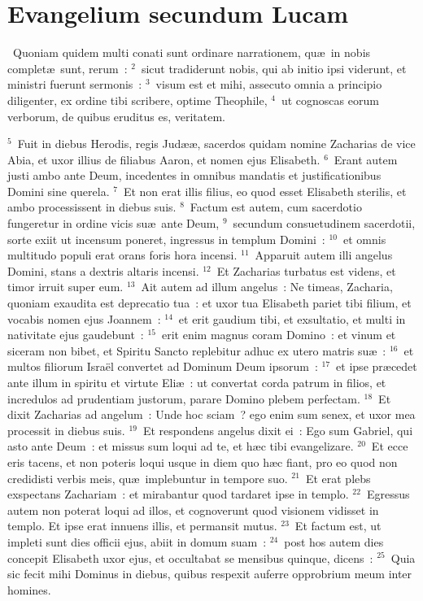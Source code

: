 \clearpage
{\centering \section*{Evangelium secundum Lucam}}\thispagestyle{empty}

~Quoniam quidem multi conati sunt ordinare narrationem, qu\ae\ in nobis complet\ae\ sunt, rerum~:
${}^{2}$~sicut tradiderunt nobis, qui ab initio ipsi viderunt, et ministri fuerunt sermonis~:
${}^{3}$~visum est et mihi, assecuto omnia a principio diligenter, ex ordine tibi scribere, optime Theophile,
${}^{4}$~ut cognoscas eorum verborum, de quibus eruditus es, veritatem.


${}^{5}$~Fuit in diebus Herodis, regis Jud\ae \ae , sacerdos quidam nomine Zacharias de vice Abia, et uxor illius de filiabus Aaron, et nomen ejus Elisabeth.
${}^{6}$~Erant autem justi ambo ante Deum, incedentes in omnibus mandatis et justificationibus Domini sine querela.
${}^{7}$~Et non erat illis filius, eo quod esset Elisabeth sterilis, et ambo processissent in diebus suis.
${}^{8}$~Factum est autem, cum sacerdotio fungeretur in ordine vicis su\ae\ ante Deum,
${}^{9}$~secundum consuetudinem sacerdotii, sorte exiit ut incensum poneret, ingressus in templum Domini~:
${}^{10}$~et omnis multitudo populi erat orans foris hora incensi.
${}^{11}$~Apparuit autem illi angelus Domini, stans a dextris altaris incensi.
${}^{12}$~Et Zacharias turbatus est videns, et timor irruit super eum.
${}^{13}$~Ait autem ad illum angelus~: Ne timeas, Zacharia, quoniam exaudita est deprecatio tua~: et uxor tua Elisabeth pariet tibi filium, et vocabis nomen ejus Joannem~:
${}^{14}$~et erit gaudium tibi, et exsultatio, et multi in nativitate ejus gaudebunt~:
${}^{15}$~erit enim magnus coram Domino~: et vinum et siceram non bibet, et Spiritu Sancto replebitur adhuc ex utero matris su\ae~:
${}^{16}$~et multos filiorum Isra\"el convertet ad Dominum Deum ipsorum~:
${}^{17}$~et ipse pr\ae cedet ante illum in spiritu et virtute Eli\ae~: ut convertat corda patrum in filios, et incredulos ad prudentiam justorum, parare Domino plebem perfectam.
${}^{18}$~Et dixit Zacharias ad angelum~: Unde hoc sciam~? ego enim sum senex, et uxor mea processit in diebus suis.
${}^{19}$~Et respondens angelus dixit ei~: Ego sum Gabriel, qui asto ante Deum~: et missus sum loqui ad te, et h\ae c tibi evangelizare.
${}^{20}$~Et ecce eris tacens, et non poteris loqui usque in diem quo h\ae c fiant, pro eo quod non credidisti verbis meis, qu\ae\ implebuntur in tempore suo.
${}^{21}$~Et erat plebs exspectans Zachariam~: et mirabantur quod tardaret ipse in templo.
${}^{22}$~Egressus autem non poterat loqui ad illos, et cognoverunt quod visionem vidisset in templo. Et ipse erat innuens illis, et permansit mutus.
${}^{23}$~Et factum est, ut impleti sunt dies officii ejus, abiit in domum suam~:
${}^{24}$~post hos autem dies concepit Elisabeth uxor ejus, et occultabat se mensibus quinque, dicens~:
${}^{25}$~Quia sic fecit mihi Dominus in diebus, quibus respexit auferre opprobrium meum inter homines.


